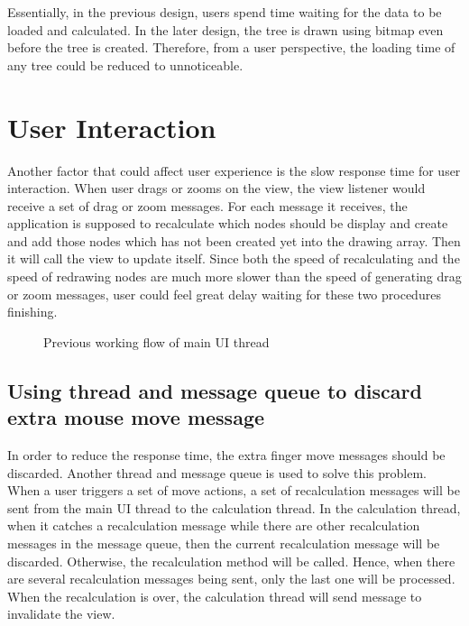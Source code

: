 \documentclass[MSc]{icldt}
\begin{document}
Essentially, in the previous design, users spend time waiting for the data to be loaded and calculated. In the later design, the tree is drawn using bitmap even before the tree is created. Therefore, from a user perspective, the loading time of any tree could be reduced to unnoticeable. 

\section{User Interaction}

Another factor that could affect user experience is the slow response time for user interaction. 
When user drags or zooms on the view, the view listener would receive a set of drag or zoom messages. For each message it receives, the application is supposed to recalculate which nodes should be display and create and add those nodes which has not been created yet into the drawing array. Then it will call the view to update itself. Since both the speed of recalculating and the speed of redrawing nodes are much more slower than the speed of generating drag or zoom messages, user could feel great delay waiting for these two procedures finishing.


\begin{figure}[H]
\caption{Previous working flow of main UI thread}
\end{figure}

\subsection{Using thread and message queue to discard extra mouse move message}

In order to reduce the response time, the extra finger move messages should be discarded. Another thread and message queue is used to solve this problem. When a user triggers a set of move actions, a set of recalculation messages will be sent from the main UI thread to the calculation thread. In the calculation thread, when it catches a recalculation message while there are other recalculation messages in the message queue, then the current recalculation message will be discarded. Otherwise, the recalculation method will be called. Hence, when there are several recalculation messages being sent, only the last one will be processed. When the recalculation is over, the calculation thread will send message to invalidate the view. 
\end{document}
